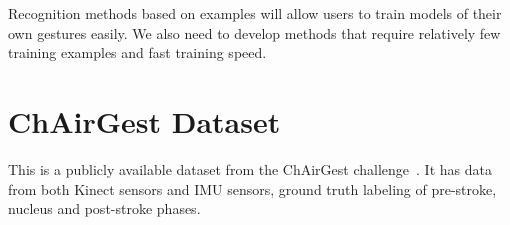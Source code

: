 Recognition methods based on examples will allow users to train models of their
own gestures easily. We also need to develop methods that
require relatively few training examples and fast training speed.

\section{ChAirGest Dataset}
This is a publicly available dataset from the ChAirGest
challenge~\cite{Ruffieux2013}. It has data from both Kinect sensors and IMU
sensors, ground truth labeling of pre-stroke, nucleus and post-stroke phases. 
